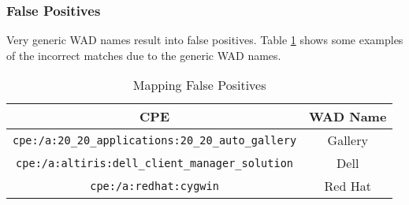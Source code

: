 \subsubsection{False Positives}
Very generic WAD names result into false positives. Table \ref{table:false_positives} shows some examples of the incorrect matches due to the generic WAD names. 
\begin{table}
\begin{center}
    \begin{tabular}{ | c | c | }
    
    \hline
	  \hhline{|*2-}
	\rowcolor{LightBlue} 
    \textbf{CPE} & \textbf{WAD Name}  
    \\ \hline
    \texttt{cpe:/a:20\_20\_applications:20\_20\_auto\_gallery} & Gallery
        \\ \hline
    \texttt{cpe:/a:altiris:dell\_client\_manager\_solution} & Dell
        \\ \hline
    \texttt{cpe:/a:redhat:cygwin} & Red Hat
        \\ \hline
    \end{tabular}
    \caption{Mapping False Positives}
    \label{table:false_positives}
   \end{center}
\end{table}

